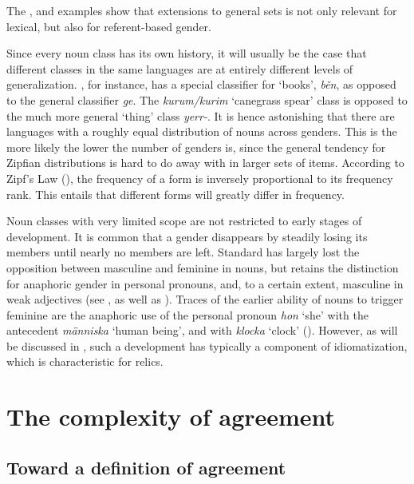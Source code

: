 \documentclass[output=collectionpaper]{langsci/langscibook}
\begin{document}
The ,  and  examples show that extensions to general sets is not only relevant for lexical, but also for referent-based gender.

Since every noun class has its own history, it will usually be the case that different classes in the same languages are at entirely different levels of generalization. , for instance, has a special classifier for `books', \textit{běn}, as opposed to the general classifier \textit{ge}. The  \textit{kurum/kurim} `canegrass spear' class is opposed to the much more general `thing' class \textit{yerr-}. It is hence astonishing that there are languages with a roughly equal distribution of nouns across genders. This is the more likely the lower the number of genders is, since the general tendency for Zipfian distributions is hard to do away with in larger sets of items. According to Zipf's Law (\citealt*{Zipf1935}), the frequency of a form is inversely proportional to its frequency rank. This entails that different forms will greatly differ in frequency.

Noun classes with very limited scope are not restricted to early stages of development. It is common that a gender disappears by steadily losing its members until nearly no members are left. Standard  has largely lost the opposition between masculine and feminine in nouns, but retains the distinction for anaphoric gender in personal pronouns, and, to a certain extent, masculine in weak adjectives (see \citealt{Dahl2000}, as well as ). Traces of the earlier ability of nouns to trigger feminine are the anaphoric use of the personal pronoun \textit{hon} `she' with the antecedent \textit{människa} `human being', and with \textit{klocka} `clock' (\citealt[61]{Teleman1999}). However, as will be discussed in , such a development has typically a component of idiomatization, which is characteristic for relics.


\section{The complexity of agreement}
\label{sec:WDG:7}

  \subsection{Toward a definition of agreement}
\label{sec:WDG:7.1}
\end{document}
